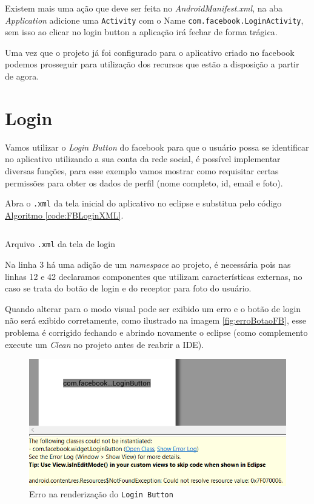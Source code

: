 \documentclass[a4paper,12pt,brazil,oneside]{book}
\begin{document}
	Existem mais uma ação que deve ser feita no \emph{AndroidManifest.xml}, na aba \emph{Application} adicione uma \texttt{Activity} com o Name \texttt{com.facebook.LoginActivity}, sem isso ao clicar no login button a aplicação irá fechar de forma trágica.
		
	Uma vez que o projeto já foi configurado para o aplicativo criado no facebook podemos prosseguir para utilização dos recursos que estão a disposição a partir de agora.
	
\newpage
	
\section{Login}
	Vamos utilizar o \emph{Login Button} do facebook para que o usuário possa se identificar no aplicativo utilizando a sua conta da rede social, é possível implementar diversas funções, para esse exemplo vamos  mostrar como requisitar certas permissões para obter os dados de perfil (nome completo, id, email e foto).
	
	Abra o \texttt{.xml} da tela inicial do aplicativo no eclipse e substitua pelo código \hyperref[code:FBLoginXML]{Algoritmo \ref*{code:FBLoginXML}}.
	
	\begin{listing}[H]
	\inputminted[linenos=true,fontsize=\small,frame=lines, framesep=2mm, tabsize=2,numbersep=5pt]{xml}{src/facebook/loginMainXML.xml}
	\caption{Arquivo \texttt{.xml} da tela de login}
	\label{code:FBLoginXML}
	\end{listing} 	
	
	Na linha 3 há uma adição de um \emph{namespace} ao projeto, é necessária pois nas linhas 12 e 42 declaramos componentes que utilizam características externas, no caso se trata do botão de login e do receptor para foto do usuário.
	
	Quando alterar para o modo visual pode ser exibido um erro e o botão de login não será exibido corretamente, como ilustrado na imagem \autoref{fig:erroBotaoFB}, esse problema é corrigido fechando e abrindo novamente o eclipse (como complemento execute um \emph{Clean} no projeto antes de reabrir a IDE).
	
	\begin{figure}[H]
  \centering
  \includegraphics[width=.75\textwidth]{figuras/facebook/errobtnlogin.png}
  \caption{Erro na renderização do \texttt{Login Button}}
  \label{fig:erroBotaoFB}
\end{figure}
\end{document}
